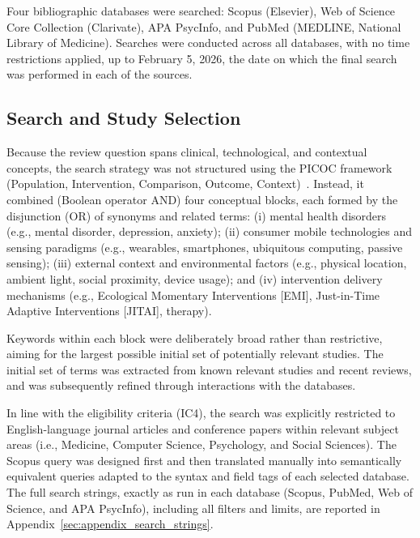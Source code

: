 Four bibliographic databases were searched: Scopus (Elsevier), Web of Science Core Collection (Clarivate), APA PsycInfo, and PubMed (MEDLINE, National Library of Medicine). 
Searches were conducted across all databases, with no time restrictions applied, up to February 5, 2026, the date on which the final search was performed in each of the sources.

\subsection{Search and Study Selection}

Because the review question spans clinical, technological, and contextual concepts, the search strategy was not structured using the PICOC framework (Population, Intervention, Comparison, Outcome, Context)~\cite{carrerarivera2022pico}. Instead, it combined (Boolean operator AND) four conceptual blocks, each formed by the disjunction (OR) of synonyms and related terms: (i) mental health disorders (e.g., mental disorder, depression, anxiety); (ii) consumer mobile technologies and sensing paradigms (e.g., wearables, smartphones, ubiquitous computing, passive sensing); (iii) external context and environmental factors (e.g., physical location, ambient light, social proximity, device usage); and (iv) intervention delivery mechanisms (e.g., Ecological Momentary Interventions [EMI], Just-in-Time Adaptive Interventions [JITAI], therapy). 

Keywords within each block were deliberately broad rather than restrictive, aiming for the largest possible initial set of potentially relevant studies. The initial set of terms was extracted from known relevant studies and recent reviews, and was subsequently refined through interactions with the databases.

In line with the eligibility criteria (IC4), the search was explicitly restricted to English-language journal articles and conference papers within relevant subject areas (i.e., Medicine, Computer Science, Psychology, and Social Sciences). The Scopus query was designed first and then translated manually into semantically equivalent queries adapted to the syntax and field tags of each selected database.
The full search strings, exactly as run in each database (Scopus, PubMed, Web of Science, and APA PsycInfo), including all filters and limits, are reported in Appendix~\ref{sec:appendix_search_strings}. 

